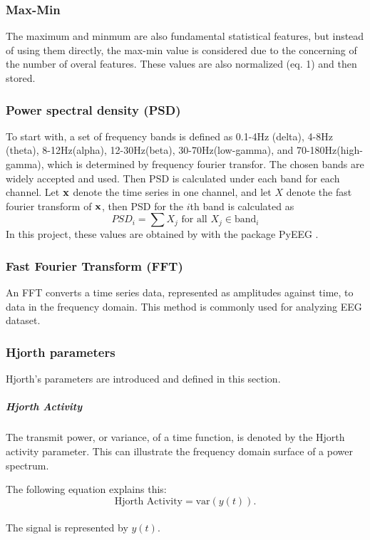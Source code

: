 \documentclass[10pt,twocolumn,letterpaper]{article}
\begin{document}
\subsubsection{Max-Min}
The maximum and minmum are also fundamental statistical features, but instead of using them directly, the max-min value is considered due to the concerning of the number of overal features. These values are also normalized (eq. 1) and then stored.

\subsubsection{Power spectral density (PSD)}
To start with, a set of frequency bands is defined as 0.1-4Hz (delta), 4-8Hz (theta), 8-12Hz(alpha), 12-30Hz(beta), 30-70Hz(low-gamma), and 70-180Hz(high-gamma)\cite{bands}, which is determined by frequency fourier transfor. The chosen bands are widely accepted and used. Then PSD is calculated under each band for each channel. Let ${\bf x}$ denote the time series in one channel, and let $X$ denote the fast fourier transform of ${\bf x}$, then PSD for the $i$th band is calculated as 
\begin{equation}
PSD_i = \sum X_j \text{  for all } X_j \in \text{band}_i
\end{equation} 
In this project, these values are obtained by with the package PyEEG \cite{pyeeg}.
\subsubsection{Fast Fourier Transform (FFT)}
An FFT converts a time series data, represented as amplitudes against time, to data in the frequency domain. This method is commonly used for analyzing EEG dataset.
\subsubsection{Hjorth parameters}
Hjorth's parameters are introduced and defined in this section\cite{HjorthParam}.
\subparagraph{Hjorth Activity}
The transmit power, or variance, of a time function, is denoted by the Hjorth activity parameter. This can illustrate the frequency domain surface of a power spectrum. 

The following equation explains this:
\begin{equation*}
\text{Hjorth Activity} ={\text{var}} (y(t)).
\end{equation*}

\paragraph{}The signal is represented by $y(t)$.
\end{document}
